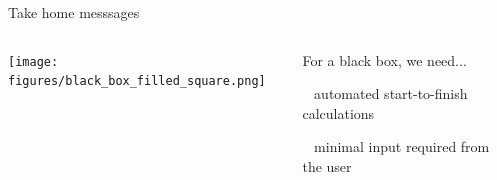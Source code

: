 \documentclass[xcolor=table,aspectratio=169]{beamer}
\numberwithin{equation}{section}
\begin{document}
% 
% 
% 
% 
% 
% 
% 
\begin{frame}{Take home messsages}

   \begin{columns}
      \begin{column}{0.5\textwidth}
         \texttt{[image: figures/black\_box\_filled\_square.png]}
      \end{column}
      \begin{column}{0.5\textwidth}
         For a black box, we need...

         \vspace{1ex}
         \
         \hspace{-2.5pt}
         automated start-to-finish calculations

         \vspace{1ex}
         \ \only<1>{$\square$}%
         \only<2->{%
            \rlap{$\square$}{\raisebox{2pt}{\large\hspace{1pt}\ding{51}}}%
            \hspace{-2.5pt}}
         minimal input required from the user
      \end{column}
   \end{columns}
\end{frame}
\end{document}
